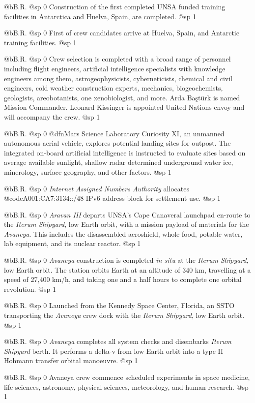 @b{B.R.}
@sp 0
Construction of the first completed UNSA funded training facilities in Antarctica and Huelva, Spain, are completed.
@sp 1

@b{B.R.}
@sp 0
First of crew candidates arrive at Huelva, Spain, and Antarctic training facilities.
@sp 1

@b{B.R.}
@sp 0
Crew selection is completed with a broad range of personnel including flight engineers, artificial intelligence specialists with knowledge engineers among them, astrogeophysicists, cyberneticists, chemical and civil engineers, cold weather construction experts, mechanics, biogeochemists, geologists, areobotanists, one xenobiologist, and more. Arda Baştürk is named Mission Commander. Leonard Kissinger is appointed United Nations envoy and will accompany the crew.
@sp 1

@b{B.R.}
@sp 0
@dfn{Mars Science Laboratory Curiosity XI}, an unmanned autonomous aerial vehicle, explores potential landing sites for outpost. The integrated on-board artificial intelligence is instructed to evaluate sites based on average available sunlight, shallow radar determined underground water ice, minerology, surface geography, and other factors.
@sp 1

@b{B.R.}
@sp 0
{\it Internet Assigned Numbers Authority} allocates @code{A001:CA7:3134::/48} IPv6 address block for settlement use. 
@sp 1

@b{B.R.}
@sp 0
{\it Aravan III} departs UNSA's Cape Canaveral launchpad en-route to the {\it Iterum Shipyard}, low Earth orbit, with a mission payload of materials for the {\it Avaneya}. This includes the disassembled aeroshield, whole food, potable water, lab equipment, and its nuclear reactor.
@sp 1

@b{B.R.}
@sp 0
{\it Avaneya} construction is completed {\it in situ} at the {\it Iterum Shipyard}, low Earth orbit. The station orbits Earth at an altitude of 340 km, travelling at a speed of 27,400 km/h, and taking one and a half hours to complete one orbital revolution.
@sp 1

@b{B.R.}
@sp 0
Launched from the Kennedy Space Center, Florida, an SSTO transporting the {\it Avaneya} crew dock with the {\it Iterum Shipyard}, low Earth orbit.
@sp 1

@b{B.R.}
@sp 0
{\it Avaneya} completes all system checks and disembarks {\it Iterum Shipyard} berth. It performs a delta-v from low Earth orbit into a type II Hohmann transfer orbital manoeuvre.
@sp 1

@b{B.R.}
@sp 0
Avaneya crew commence scheduled experiments in space medicine, life sciences, astronomy, physical sciences, meteorology, and human research.
@sp 1

